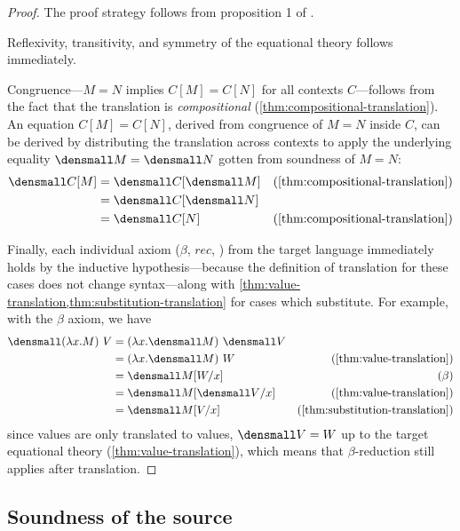 \thmconservativeextension*
\begin{proof}
  The proof strategy follows from proposition 1 of \cite{DownenAriola2014CSCC}.
  
  Reflexivity, transitivity, and symmetry of the equational theory follows immediately.

  Congruence---$M = N$ implies $C[M] = C[N]$ for all contexts $C$---follows from
  the fact that the translation is \emph{compositional}
  (\cref{thm:compositional-translation}).  An equation $C[M] = C[N]$, derived
  from congruence of $M = N$ inside $C$, can be derived by distributing the
  translation across contexts to apply the underlying equality
  $\den{M} = \den{N}$ gotten from soundness of $M = N$:
  \begin{align*}
    \den{C[M]}
    &=
    \den{C}{[\den{M}]}
    &(\cref{thm:compositional-translation})
    \\
    &=
    \den{C}{[\den{N}]}
    \\
    &=
    \den{C[N]}
    &(\cref{thm:compositional-translation})
  \end{align*}

  Finally, each individual axiom ($\beta$, $rec$, \etc) from the target language
  immediately holds by the inductive hypothesis---because the definition of
  translation for these cases does not change syntax---along with
  \cref{thm:value-translation,thm:substitution-translation} for cases which
  substitute.  For example, with the $\beta$ axiom, we have
  \begin{align*}
    \den{(\lambda x. M) ~ V}
    &=
    (\lambda x. \den{M}) ~ \den{V}
    \\
    &=
    (\lambda x. \den{M}) ~ W
    &(\cref{thm:value-translation})
    \\
    &=
    \den{M}\subst{x}{W}
    &(\beta)
    \\
    &=
    \den{M}\subst{x}{\den{V}}
    &(\cref{thm:value-translation})
    \\
    &=
    \den{M\subst{x}{V}}
    &(\cref{thm:substitution-translation})
  \end{align*}
  since values are only translated to values, $\den{V} = W$ up to the target equational theory (\cref{thm:value-translation}), which means that $\beta$-reduction still applies after translation.
\end{proof}

\subsection{Soundness of the source}

